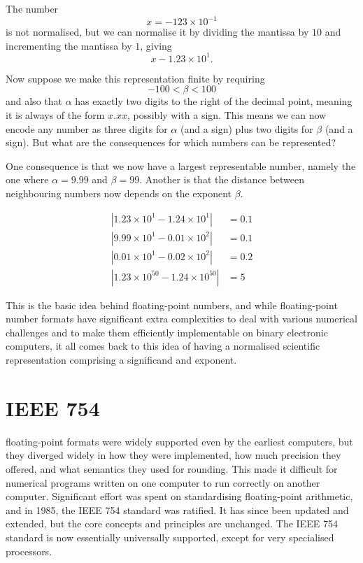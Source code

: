\begin{example}
  The number
  \[
    x = -123 \times 10^{-1}
  \]
  is not normalised, but we can normalise it by dividing the mantissa
  by $10$ and incrementing the mantissa by $1$, giving
  \[
    x -1.23 \times 10^{1}.
  \]
\end{example}

Now suppose we make this representation finite by requiring
\[
  -100 < \beta < 100
\]
and also that $\alpha$ has exactly two digits to the right of the
decimal point, meaning it is always of the form $x.xx$, possibly with
a sign.  This means we can now encode any number as three digits for
$\alpha$ (and a sign) plus two digits for $\beta$ (and a sign).  But
what are the consequences for which numbers can be represented?

One consequence is that we now have a largest representable number,
namely the one where $\alpha=9.99$ and $\beta=99$.  Another is that
the distance between neighbouring numbers now depends on the exponent
$\beta$.
\begin{example}
\begin{align}
  |1.23\times 10^{1} - 1.24\times 10^{1}| &= 0.1 \\
  |9.99\times 10^{1} - 0.01\times 10^{2}| &= 0.1 \\
  |0.01\times 10^{1} - 0.02\times 10^{2}| &= 0.2 \\
  |1.23\times 10^{50} - 1.24\times 10^{50}| &= 5
\end{align}
\end{example}

This is the basic idea behind floating-point numbers, and while
floating-point number formats have significant extra complexities to
deal with various numerical challenges and to make them efficiently
implementable on binary electronic computers, it all comes back to
this idea of having a normalised scientific representation comprising
a significand and exponent.

\section{IEEE 754}

floating-point formats were widely supported even by the earliest
computers, but they diverged widely in how they were implemented, how
much precision they offered, and what semantics they used for
rounding.  This made it difficult for numerical programs written on
one computer to run correctly on another computer.  Significant effort
was spent on standardising floating-point arithmetic, and in 1985, the
IEEE 754 standard was ratified.  It has since been updated and
extended, but the core concepts and principles are unchanged.  The
IEEE 754 standard is now essentially universally supported, except for
very specialised processors.


